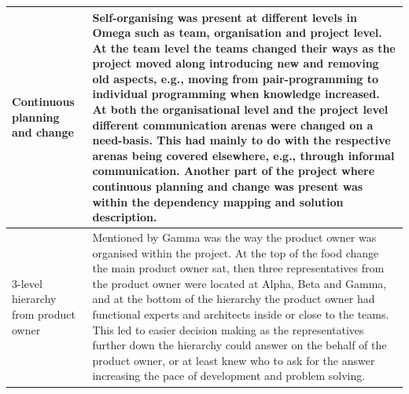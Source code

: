 \begin{center}
\begin{longtable}{| p{6cm} | p{9cm} |}
    Continuous planning and change & Self-organising was present at different levels in Omega such as team, organisation and project level. At the team level the teams changed their ways as the project moved along introducing new and removing old aspects, e.g., moving from pair-programming to individual programming when knowledge increased. At both the organisational level and the project level different communication arenas were changed on a need-basis. This had mainly to do with the respective arenas being covered elsewhere, e.g., through informal communication. Another part of the project where continuous planning and change was present was within the dependency mapping and solution description. \\ \hline
    3-level hierarchy from product owner & Mentioned by Gamma was the way the product owner was organised within the project. At the top of the food change the main product owner sat, then three representatives from the product owner were located at Alpha, Beta and Gamma, and at the bottom of the hierarchy the product owner had functional experts and architects inside or close to the teams. This led to easier decision making as the representatives further down the hierarchy could answer on the behalf of the product owner, or at least knew who to ask for the answer increasing the pace of development and problem solving. \\ \hline




\end{longtable}
\end{center}
